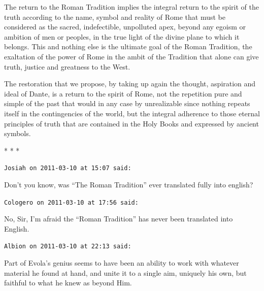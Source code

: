 \begin{quotationx}
The return to the Roman Tradition implies the integral return to the spirit of the truth according to the name, symbol and reality of Rome that must be considered as the sacred, indefectible, unpolluted apex, beyond any egoism or ambition of men or peoples, in the true light of the divine plane to which it belongs. This and nothing else is the ultimate goal of the Roman Tradition, the exaltation of the power of Rome in the ambit of the Tradition that alone can give truth, justice and greatness to the West.

The restoration that we propose, by taking up again the thought, aspiration and ideal of Dante, is a return to the spirit of Rome, not the repetition pure and simple of the past that would in any case by unrealizable since nothing repeats itself in the contingencies of the world, but the integral adherence to those eternal principles of truth that are contained in the Holy Books and expressed by ancient symbols.
\end{quotationx}




\begin{center}* * *\end{center}

\begin{footnotesize}
\begin{sffamily}
\texttt{Josiah on 2011-03-10 at 15:07 said:}

Don't you know, was ``The Roman Tradition'' ever translated fully into english?

\hfill

\texttt{Cologero on 2011-03-10 at 17:56 said:}

No, Sir, I'm afraid the ``Roman Tradition'' has never been translated into English.

\hfill

\texttt{Albion on 2011-03-10 at 22:13 said:}

Part of Evola's genius seems to have been an ability to work with whatever material he found at hand, and unite it to a single aim, uniquely his own, but faithful to what he knew as beyond Him.


\hfill

\end{sffamily}
\end{footnotesize}

